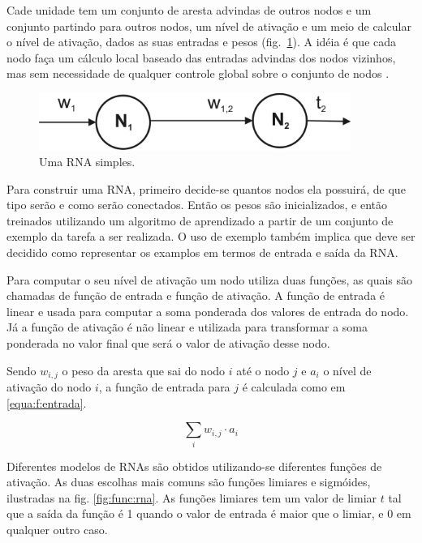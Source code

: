 Cade unidade tem um conjunto de aresta advindas de outros nodos e um conjunto partindo para outros nodos, um nível de ativação e um meio de calcular o nível de ativação, dados as suas entradas e pesos (fig.~\ref{fig:rnaSimples}). A idéia é que cada nodo faça um cálculo local baseado das entradas advindas dos nodos vizinhos, mas sem necessidade de qualquer controle global sobre o conjunto de nodos \cite{russel:modern}.

\begin{figure}[ht]
 \begin{center}
  \includegraphics[width=4in]{imagens/rnaSimples.png}
 \end{center}
 \caption{Uma RNA simples.}
 \label{fig:rnaSimples}
\end{figure}

Para construir uma RNA, primeiro decide-se quantos nodos ela possuirá, de que tipo serão e como serão conectados. Então os pesos são inicializados, e então treinados utilizando um algoritmo de aprendizado a partir de um conjunto de exemplo da tarefa a ser realizada. O uso de exemplo também implica que deve ser decidido como representar os examplos em termos de entrada e saída da RNA.

Para computar o seu nível de ativação um nodo utiliza duas funções, as quais são chamadas de função de entrada e função de ativação. A função de entrada é linear e usada para computar a soma ponderada dos valores de entrada do nodo. Já a função de ativação é não linear e utilizada para transformar a soma ponderada no valor final que será o valor de ativação desse nodo.

Sendo $w_{i,j}$ o peso da aresta que sai do nodo $i$ até o nodo $j$ e $a_i$ o nível de ativação do nodo $i$, a função de entrada para $j$ é calculada como em \ref{equa:f:entrada}.

\begin{equation}
	\sum_{i} w_{i,j} \cdot a_i
	\label{equa:f:entrada}
\end{equation}

Diferentes modelos de RNAs são obtidos utilizando-se diferentes funções de ativação. As duas escolhas mais comuns são funções limiares e sigmóides, ilustradas na fig. \ref{fig:func:rna}. As funções limiares tem um valor de limiar $t$ tal que a saída da função é 1 quando o valor de entrada é maior que o limiar, e 0 em qualquer outro caso.

